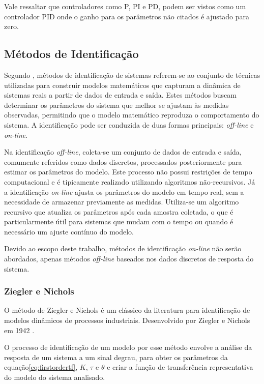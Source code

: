 Vale ressaltar que controladores como P, PI e PD, podem ser vistos como um controlador PID onde o ganho para os
parâmetros não citados é ajustado para zero.

\subsection{Métodos de Identificação}

Segundo \cite{CoelhoIdentificacao}, métodos de identificação de sistemas referem-se ao conjunto de técnicas
utilizadas para construir modelos matemáticos que capturam a dinâmica de sistemas reais a partir de dados de entrada e
saída.
Estes métodos buscam determinar os parâmetros do sistema que melhor se ajustam às medidas observadas,
permitindo que o modelo matemático reproduza o comportamento do sistema.
A identificação pode ser conduzida de duas formas principais: \textit{off-line} e \textit{on-line}.

Na identificação \textit{off-line}, coleta-se um conjunto de dados de entrada e saída, comumente referidos como dados discretos,
processados posteriormente para estimar os parâmetros do modelo.
Este processo não possui restrições de tempo computacional e é tipicamente realizado utilizando algoritmos
não-recursivos.
Já a identificação \textit{on-line} ajusta os parâmetros do modelo em tempo real, sem a necessidade de armazenar previamente as
medidas.
Utiliza-se um algoritmo recursivo que atualiza os parâmetros após cada amostra coletada,
o que é particularmente útil para sistemas que mudam com o tempo ou quando é necessário um ajuste contínuo do modelo.

Devido ao escopo deste trabalho, métodos de identificação \textit{on-line} não serão abordados, apenas métodos \textit{off-line} baseados
nos dados discretos de resposta do sistema.

\subsubsection{Ziegler e Nichols}\label{subsubsec:znfun}

O método de Ziegler e Nichols é um clássico da literatura para identificação de modelos dinâmicos de
processos industriais.
Desenvolvido por Ziegler e Nichols em 1942 \cite{CoelhoIdentificacao}.

O processo de identificação de um modelo por esse método envolve a análise da resposta de um sistema a um sinal
degrau, para obter os parâmetros da equação\eqref{eq:firstordertf}, $K$, $\tau$ e $\theta$ e criar
a função de transferência representativa do modelo do sistema analisado.


